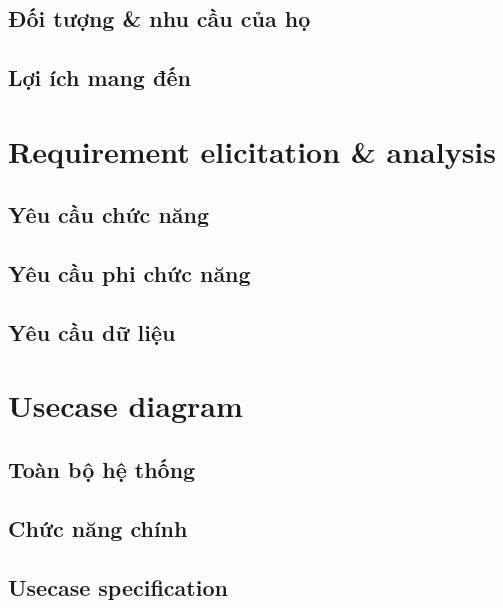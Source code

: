\subsection{Đối tượng \& nhu cầu của họ}

\subsection{Lợi ích mang đến}

\newpage

\section{Requirement elicitation \& analysis}
\subsection{Yêu cầu chức năng}

\subsection{Yêu cầu phi chức năng}

\subsection{Yêu cầu dữ liệu}

\newpage

\section{Usecase diagram}
\subsection{Toàn bộ hệ thống}
\subsection{Chức năng chính}
\subsection{Usecase specification}


